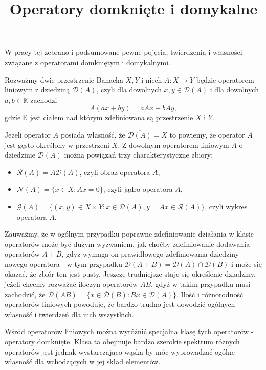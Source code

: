 \documentclass[12pt]{article}
\title{Operatory domknięte i domykalne}
\begin{document}
\maketitle
W pracy tej zebrano i podsumowane pewne pojęcia, twierdzenia i własności związane z operatorami domkniętym i domykalnymi.\par


Rozważmy dwie przestrzenie Banacha $X,Y$ i niech $A\colon X \to Y$ będzie operatorem liniowym z dziedziną $\mathcal{D}(A)$, czyli dla dowolnych $x,y \in \mathcal{D}(A)$ i dla dowolnych $a, b\in \mathbb{K}$ zachodzi
\begin{displaymath}
	A(ax+by)= aAx + bAy,
\end{displaymath}
gdzie $\mathbb{K}$ jest ciałem nad którym zdefiniowana są przestrzenie $X$ i $Y$.\par 
Jeżeli operator $A$ posiada własność, że $\overline{\mathcal{D}(A)} = X$ to powiemy, że operator $A$ jest gęsto określony w przestrzeni $X$. Z dowolnym operatorem liniowym $A$ o dziedzinie $\mathcal{D}(A)$ można powiązań trzy charakterystyczne zbiory:
\begin{itemize}
	\item $\mathcal{R}(A) = A\mathcal{D}(A)$, czyli obraz operatora $A$,
	\item $\mathcal{N}(A) = \{x\in X\colon Ax= 0\}$, czyli jądro operatora $A$,
	\item $\mathcal{G}(A) = \{(x,y) \in X\times Y\colon x\in\mathcal{D}(A), y = Ax\in \mathcal{R}(A)\}$, czyli wykres operatora $A$.
\end{itemize}
Zauważmy, że w ogólnym przypadku poprawne zdefiniowanie działania w klasie operatorów może być dużym wyzwaniem, jak choćby zdefiniowanie dodawania operatorów $A+B$, gdyż wymaga on prawidłowego zdefiniowania dziedziny nowego operatora - w tym przypadku $\mathcal{D}(A+B) = \mathcal{D}(A)\cap \mathcal{D}(B)$ i może się okazać, że zbiór ten jest pusty. Jeszcze trudniejsze staje się określenie dziadziny, jeżeli chcemy rozważać iloczyn operatorów $AB$, gdyż w takim przypadku musi zachodzić, że $\mathcal{D}(AB) = \{x\in \mathcal{D}(B)\colon Bx \in \mathcal{D}(A)\}$. Ilość i różnorodność operatorów liniowych powoduje, że bardzo trudno jest dowodzić ogólnych własność i twierdzeń dla nich wszystkich.\par 
Wśród operatorów liniowych można wyróżnić specjalna klasę tych operatorów - operatory domknięte. Klasa ta obejmuje bardzo szerokie spektrum różnych operatorów jest jednak wystarczająco wąska by móc wyprowadzać ogólne własność dla wchodzących w jej skład elementów. 
\end{document}
